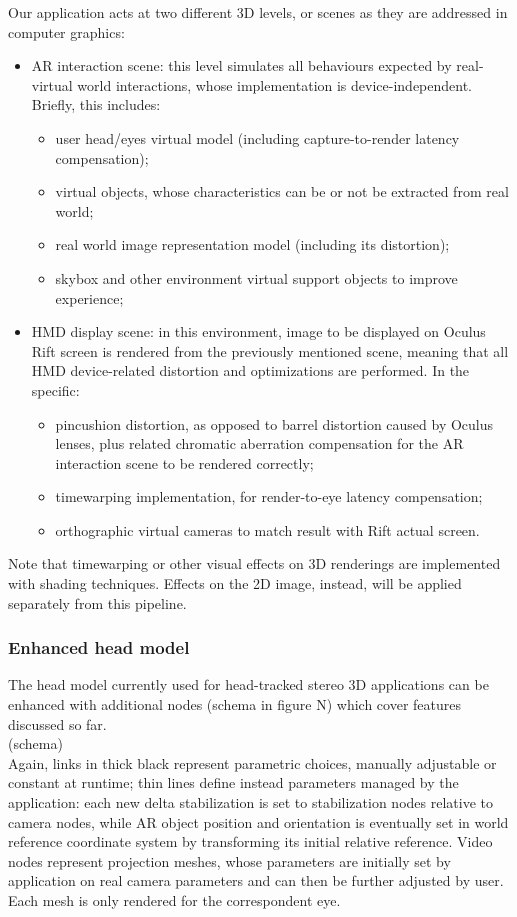 Our application acts at two different 3D levels, or scenes as they are addressed in computer graphics:
\begin{itemize}
\item AR interaction scene: this level simulates all behaviours expected by real-virtual world interactions, whose implementation is device-independent. Briefly, this includes:
\begin{itemize}
\item user head/eyes virtual model (including capture-to-render latency compensation);
\item virtual objects, whose characteristics can be or not be extracted from real world;
\item real world image representation model (including its distortion);
\item skybox and other environment virtual support objects to improve experience;
\end{itemize}
\item HMD display scene: in this environment, image to be displayed on Oculus Rift screen is rendered from the previously mentioned scene, meaning that all HMD device-related distortion and optimizations are performed. In the specific:
\begin{itemize}
\item pincushion distortion, as opposed to barrel distortion caused by Oculus lenses, plus related chromatic aberration compensation for the AR interaction scene to be rendered correctly;
\item timewarping implementation, for render-to-eye latency compensation;
\item orthographic virtual cameras to match result with Rift actual screen.
\end{itemize}
\end{itemize}
Note that timewarping or other visual effects on 3D renderings are implemented with shading techniques. Effects on the 2D image, instead, will be applied separately from this pipeline.

\subsubsection{Enhanced head model}
The head model currently used for head-tracked stereo 3D applications can be enhanced with additional nodes (schema in figure N) which cover features discussed so far.\\
(schema)\\
Again, links in thick black represent parametric choices, manually adjustable or constant at runtime; thin lines define instead parameters managed by the application: each new delta stabilization is set to stabilization nodes relative to camera nodes, while AR object position and orientation is eventually set in world reference coordinate system by transforming its initial relative reference. Video nodes represent projection meshes, whose parameters are initially set by application on real camera parameters and can then be further adjusted by user. Each mesh is only rendered for the correspondent eye.

